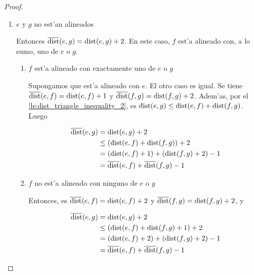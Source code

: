 \begin{theorem}
\begin{proof}
\begin{enumerate}
\item $e$ y $g$ no est'an alineados

Entonces $\overline{\textnormal{dist}}(e, g) = \textnormal{dist}(e, g) + 2$. En este caso, $f$ est'a alineado con, a lo sumo, uno de $e$ o $g$.

\begin{enumerate}
\item $f$ est'a alineado con exactamente uno de $e$ o $g$

Supongamos que est'a alineado con $e$. El otro caso es igual. Se tiene  $\overline{\textnormal{dist}}(e, f) = \textnormal{dist}(e, f) + 1$ y $\overline{\textnormal{dist}}(f, g) = \textnormal{dist}(f, g) + 2$. Adem'as, por el \autoref{le:dist_triangle_inequality_2}, es $\textnormal{dist}(e, g) \leq \textnormal{dist}(e, f) + \textnormal{dist}(f, g)$. Luego

\begin{align*}
\overline{\textnormal{dist}}(e, g) &= \textnormal{dist}(e, g) + 2\\
&\leq (\textnormal{dist}(e, f) + \textnormal{dist}(f, g)) + 2\\
&= (\textnormal{dist}(e, f) + 1) + (\textnormal{dist}(f, g) + 2) - 1\\
&= \overline{\textnormal{dist}}(e, f) + \overline{\textnormal{dist}}(f, g) - 1
\end{align*}

\item $f$ no est'a alineado con ninguno de $e$ o $g$

Entonces, es $\overline{\textnormal{dist}}(e, f) = \textnormal{dist}(e, f) + 2$ y $\overline{\textnormal{dist}}(f, g) = \textnormal{dist}(f, g) + 2$, y

\begin{align*}
\overline{\textnormal{dist}}(e, g) &= \textnormal{dist}(e, g) + 2\\
&\leq (\textnormal{dist}(e, f) + \textnormal{dist}(f, g) + 1) + 2\\
&= (\textnormal{dist}(e, f) + 2) + (\textnormal{dist}(f, g) + 2) - 1\\
&= \overline{\textnormal{dist}}(e, f) + \overline{\textnormal{dist}}(f, g) - 1
\end{align*}
\end{enumerate}
\end{enumerate}

\end{proof}
\end{theorem}